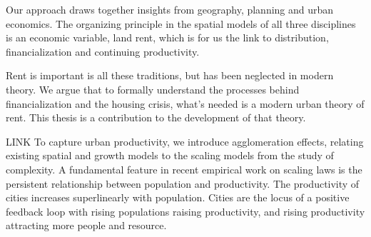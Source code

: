 


Our approach draws together insights from %
geography, planning and urban economics. 
The organizing principle in the spatial models of all three disciplines is an economic variable, land rent, which is for us the link to distribution, financialization and continuing productivity. %

Rent is important is all these traditions, but has been neglected in modern theory. We argue that to formally understand the processes behind financialization and the housing crisis, what's needed is a modern urban theory of rent. This thesis is a contribution to the development of that theory. 

LINK
To capture urban productivity, we introduce %
agglomeration effects, relating existing spatial and growth models to the scaling models from the study of complexity. A fundamental feature in recent empirical work on scaling laws is %
the persistent relationship between population and productivity. The productivity of cities increases superlinearly with population. Cities are the locus of a positive feedback loop with rising populations raising productivity, and rising productivity attracting more people and resource.






